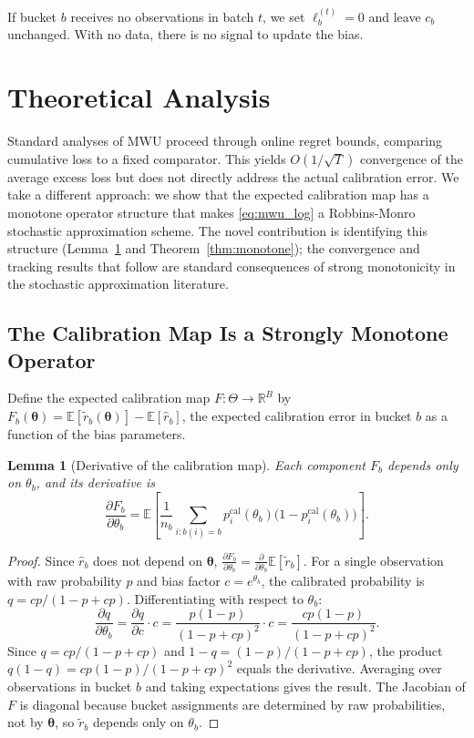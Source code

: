 \documentclass[12pt, letterpaper]{article}
\newtheorem{lemma}[theorem]{Lemma}
\theoremstyle{definition}
\theoremstyle{remark}
\begin{document}
If bucket $b$ receives no observations in batch $t$, we set $\ell_b^{(t)} = 0$ and leave $c_b$ unchanged. With no data, there is no signal to update the bias.

\section{Theoretical Analysis}
\label{sec:theory}

Standard analyses of MWU proceed through online regret bounds, comparing cumulative loss to a fixed comparator. This yields $O(1/\sqrt{T})$ convergence of the average excess loss but does not directly address the actual calibration error. We take a different approach: we show that the expected calibration map has a monotone operator structure that makes \eqref{eq:mwu_log} a Robbins-Monro stochastic approximation scheme. The novel contribution is identifying this structure (Lemma~\ref{lem:derivative} and Theorem~\ref{thm:monotone}); the convergence and tracking results that follow are standard consequences of strong monotonicity in the stochastic approximation literature.

\subsection{The Calibration Map Is a Strongly Monotone Operator}

Define the expected calibration map $F: \Theta \to \mathbb{R}^B$ by $F_b(\boldsymbol{\theta}) = \mathbb{E}[\tilde{r}_b(\boldsymbol{\theta})] - \mathbb{E}[\hat{r}_b]$, the expected calibration error in bucket $b$ as a function of the bias parameters.

\begin{lemma}[Derivative of the calibration map]
\label{lem:derivative}
Each component $F_b$ depends only on $\theta_b$, and its derivative is
\[
\frac{\partial F_b}{\partial \theta_b} = \mathbb{E}\!\left[\frac{1}{n_b}\sum_{i:b(i)=b} p_i^{\mathrm{cal}}(\theta_b)\bigl(1-p_i^{\mathrm{cal}}(\theta_b)\bigr)\right].
\]
\end{lemma}

\begin{proof}
Since $\hat{r}_b$ does not depend on $\boldsymbol{\theta}$, $\frac{\partial F_b}{\partial \theta_b} = \frac{\partial}{\partial \theta_b}\mathbb{E}[\tilde{r}_b]$. For a single observation with raw probability $p$ and bias factor $c = e^{\theta_b}$, the calibrated probability is $q = cp/(1-p+cp)$. Differentiating with respect to $\theta_b$:
\[
\frac{\partial q}{\partial \theta_b} = \frac{\partial q}{\partial c}\cdot c = \frac{p(1-p)}{(1-p+cp)^2}\cdot c = \frac{cp(1-p)}{(1-p+cp)^2}.
\]
Since $q = cp/(1-p+cp)$ and $1-q = (1-p)/(1-p+cp)$, the product $q(1-q) = cp(1-p)/(1-p+cp)^2$ equals the derivative. Averaging over observations in bucket $b$ and taking expectations gives the result. The Jacobian of $F$ is diagonal because bucket assignments are determined by raw probabilities, not by $\boldsymbol{\theta}$, so $\tilde{r}_b$ depends only on $\theta_b$.
\end{proof}
\end{document}
